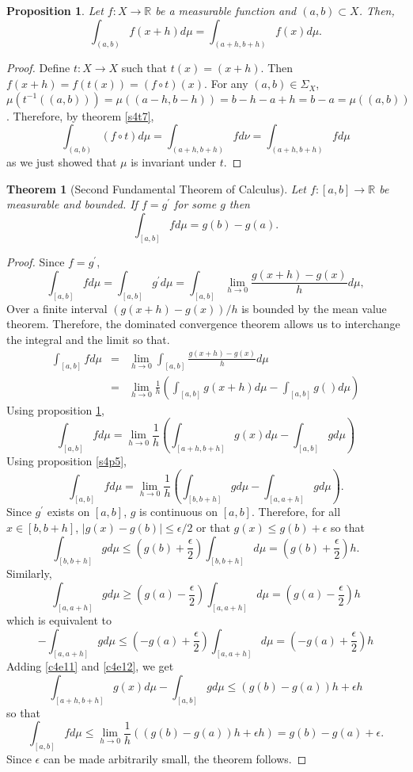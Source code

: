 \documentclass{article}
\newcommand{\sor}{\mathbb{R}}
\newcommand{\op}{\prime}
\theoremstyle{plain}
\newtheorem{thm}{Theorem}
\numberwithin{thm}{section}
\theoremstyle{plain}
\newtheorem{prop}{Proposition}
\numberwithin{prop}{section}
\theoremstyle{definition}
\numberwithin{defn}{section}
\theoremstyle{remark}
\theoremstyle{plain}
\numberwithin{cor}{section}
\numberwithin{equation}{section}
\begin{document}
\begin{prop}\label{s4p9}
Let $f: X \rightarrow \sor$ be a measurable function and $(a, b) \subset X$. 
Then,
\[
\int_{(a, b)} f(x + h) d\mu = \int_{(a+h, b+h)}f(x) d\mu.
\]
\end{prop}
\begin{proof}
Define $t: X \rightarrow X$ such that $t(x) = (x + h)$. Then $f(x + h) = f(t(x))
= (f \circ t)(x)$. For any $(a, b) \in \Sigma_X$, $\mu(t^{-1}((a, b))) = \mu((
a-h, b-h)) = b - h - a + h = b - a = \mu((a, b))$. Therefore, by theorem 
\ref{s4t7},
\[
\int_{(a, b)} (f \circ t)d\mu = \int_{(a+h, b+h)} fd\nu = \int_{(a+h, b+h)}fd\mu
\]
as we just showed that $\mu$ is invariant under $t$.
\end{proof}

\begin{thm}[Second Fundamental Theorem of Calculus]\label{s4t10} Let $f:[a, b]
\rightarrow \sor$ be measurable and bounded. If $f = g^\op$ for some $g$ then
\[
\int_{[a, b]} fd\mu = g(b) - g(a).
\]
\end{thm}
\begin{proof}
Since $f = g^\op$,
\[
\int_{[a, b]} fd\mu = \int_{[a, b]} g^\op d\mu = 
\int_{[a, b]} \lim_{h \rightarrow 0}\frac{g(x+h)-g(x)}{h}d\mu,
\]
Over a finite interval $(g(x+h)-g(x))/h$ is bounded by the mean value theorem.
Therefore, the dominated convergence theorem allows us to interchange the 
integral and the limit so that.
\begin{eqnarray*}
\int_{[a, b]} fd\mu &=&
	\lim_{h \rightarrow 0}\int_{[a, b]}\frac{g(x+h)-g(x)}{h}d\mu \\
 &=& \lim_{h \rightarrow 0}\frac{1}{h}\left(\int_{[a, b]}g(x+h)d\mu
	- \int_{[a, b]}g()d\mu\right)
\end{eqnarray*}
Using proposition \ref{s4p9},
\[
\int_{[a, b]} fd\mu = \lim_{h \rightarrow 0}\frac{1}{h}
\left(\int_{[a+h, b+h]}g(x)d\mu - \int_{[a, b]}gd\mu\right)
\]
Using proposition \ref{s4p5},
\[
\int_{[a, b]} fd\mu = \lim_{h \rightarrow 0}\frac{1}{h}
\left(\int_{[b,b+h]}g d\mu - \int_{[a, a+h]}gd\mu\right).
\]
Since $g^\op$ exists on $[a, b]$, $g$ is continuous on $[a, b]$. Therefore,
for all $x \in [b, b+h]$, $|g(x) - g(b)| \le \epsilon/2$ or that $g(x) \le g(b) + 
\epsilon$ so that
\begin{equation}\label{c4e11}
\int_{[b, b+h]}gd\mu \le \left(g(b) + \frac{\epsilon}{2}\right)\int_{[b,b+h]}d\mu = 
\left(g(b)+\frac{\epsilon}{2}\right)h.
\end{equation}
Similarly,
\[
\int_{[a, a+h]}gd\mu \ge \left(g(a) - \frac{\epsilon}{2}\right)\int_{[a,a+h]}d\mu = 
\left(g(a)-\frac{\epsilon}{2}\right)h
\]
which is equivalent to
\begin{equation}\label{c4e12}
-\int_{[a, a+h]}gd\mu \le \left(-g(a) + \frac{\epsilon}{2}\right)\int_{[a,a+h]}d\mu = 
\left(-g(a)+\frac{\epsilon}{2}\right)h
\end{equation}
Adding \eqref{c4e11} and \eqref{c4e12}, we get
\[
\int_{[a+h, b+h]}g(x)d\mu - \int_{[a, b]}gd\mu \le (g(b)-g(a))h + \epsilon h
\]
so that
\[
\int_{[a, b]} fd\mu \le \lim_{h \rightarrow 0}\frac{1}{h}((g(b)-g(a))h + \epsilon h)
= g(b) - g(a) + \epsilon.
\]
Since $\epsilon$ can be made arbitrarily small, the theorem follows.
\end{proof}
\end{document}
